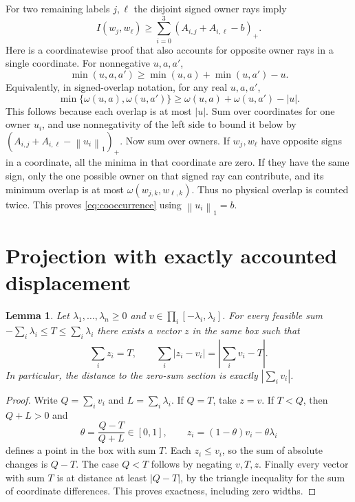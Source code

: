 \documentclass[11pt]{article}
\newtheorem{lemma}[theorem]{Lemma}
\theoremstyle{definition}
\theoremstyle{remark}
\newcommand{\norm}[1]{\left\lVert#1\right\rVert_1}
\newcommand{\abs}[1]{\left|#1\right|}
\newcommand{\pos}[1]{\left(#1\right)_+}
\begin{document}
For two remaining labels $j,\ell$ the disjoint signed owner rays imply
\begin{equation}\label{eq:cooccurrence}
 I(w_j,w_\ell)\geq
    \sum_{i=0}^3\pos{A_{i,j}+A_{i,\ell}-b}.
\end{equation}
Here is a coordinatewise proof that also accounts for opposite owner
rays in a single coordinate. For nonnegative $u,a,a'$,
\[
 \min(u,a,a')\geq\min(u,a)+\min(u,a')-u.
\]
Equivalently, in signed-overlap notation, for any real $u,a,a'$,
\[
 \min\{\omega(u,a),\omega(u,a')\}
 \geq\omega(u,a)+\omega(u,a')-\abs u.
\]
This follows because each overlap is at most $\abs u$. Sum over
coordinates for one owner $u_i$, and use nonnegativity of the left
side to bound it below by
$\pos{A_{i,j}+A_{i,\ell}-\norm{u_i}}$.
Now sum over owners. If $w_j,w_\ell$ have opposite signs in a
coordinate, all the minima in that coordinate are zero. If they have
the same sign, only the one possible owner on that signed ray can
contribute, and its minimum overlap is at most
$\omega(w_{j,k},w_{\ell,k})$. Thus no physical overlap is counted
twice. This proves \eqref{eq:cooccurrence} using $\norm{u_i}=b$.

\section{Projection with exactly accounted displacement}\label{sec:projection}

\begin{lemma}\label{lem:boxprojection}
Let $\lambda_1,\ldots,\lambda_n\geq0$ and
$v\in\prod_i[-\lambda_i,\lambda_i]$. For every feasible sum
$-\sum_i\lambda_i\leq T\leq\sum_i\lambda_i$ there exists a vector
$z$ in the same box such that
\[
 \sum_i z_i=T,\qquad
 \sum_i\abs{z_i-v_i}=\abs{\sum_i v_i-T}.
\]
In particular, the distance to the zero-sum section is exactly
$\abs{\sum_i v_i}$.
\end{lemma}

\begin{proof}
Write $Q=\sum_i v_i$ and $L=\sum_i\lambda_i$. If $Q=T$, take
$z=v$. If $T<Q$, then $Q+L>0$ and
\[
 \theta=\frac{Q-T}{Q+L}\in[0,1],\qquad
 z_i=(1-\theta)v_i-\theta\lambda_i
\]
defines a point in the box with sum $T$. Each $z_i\leq v_i$, so the
sum of absolute changes is $Q-T$. The case $Q<T$ follows by negating
$v,T,z$. Finally every vector with sum $T$ is at distance at least
$\abs{Q-T}$, by the triangle inequality for the sum of coordinate
differences. This proves exactness, including zero widths.
\end{proof}
\end{document}
